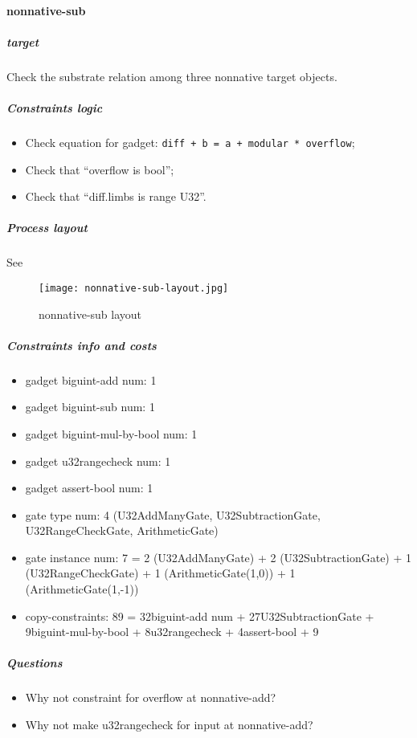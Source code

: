 \paragraph{nonnative-sub}

\subparagraph{target}
Check the substrate relation among three nonnative target objects.

\subparagraph{Constraints logic}
\begin{itemize}
    \item Check equation for gadget: \verb|diff + b = a + modular * overflow|;
    \item Check that ``overflow is bool'';
    \item Check that ``diff.limbs is range U32''.
\end{itemize}

\subparagraph{Process layout}
See 
\begin{figure}[!ht]
    \centering
    \texttt{[image: nonnative-sub-layout.jpg]}
    \caption{nonnative-sub layout}
    \label{fig:nonnative-sub-layout}
\end{figure}

\subparagraph{Constraints info and costs}
\begin{itemize}
    \item gadget biguint-add num: 1
    \item gadget biguint-sub num: 1
    \item gadget biguint-mul-by-bool num: 1
    \item gadget u32rangecheck num: 1
    \item gadget assert-bool num: 1
    \item gate type num: 4 (U32AddManyGate, U32SubtractionGate, U32RangeCheckGate, ArithmeticGate)
    \item gate instance num: 7 = 2 (U32AddManyGate) + 2 (U32SubtractionGate) + 1 (U32RangeCheckGate) + 1 (ArithmeticGate(1,0)) + 1 (ArithmeticGate(1,-1))
    \item copy-constraints: 89 = 32{biguint-add num} + 27{U32SubtractionGate} + 9{biguint-mul-by-bool} + 8{u32rangecheck} + 4{assert-bool} + 9
\end{itemize}

\subparagraph{Questions}
\begin{itemize}
    \item Why not constraint for overflow at nonnative-add?
    \item Why not make u32rangecheck for input at nonnative-add?
\end{itemize}
